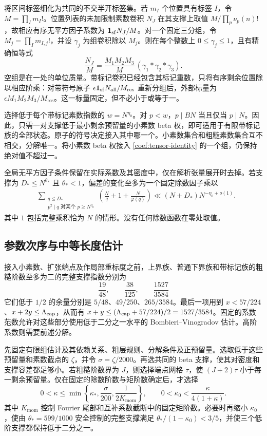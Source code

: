将区间标签细化为共同的不交半开标签集。若 $m_I$ 个位置具有标签 $I$，令 $M=\prod_I m_I!$。位置列表的未加限制素数卷积 $N_J$ 在其支撑上取值 $M/\prod_p\nu_p(n)!$，故相应有序无平方因子系数为 $\mathbf 1_{\mathrm{sf}}N_J/M$。对一个固定三分组，令 $M_j=\prod_I m_{I,j}!$，并设 $\gamma_j$ 为组卷积除以 $M_j$。则在每个整数上 $0\le\gamma_j\le1$，且有精确恒等式
\begin{equation}
 \frac{N_J}{M}
 =\frac{M_1M_2M_3}{M}\,
       (\gamma_1*\gamma_2*\gamma_3).
 \label{coef:tensor-identity}
\end{equation}
空组是在一处的单位质量。带标记卷积已经包含其标记重数，只将有序剩余位置除以相应阶乘：对带符号原子
$\epsilon\mathbf 1_{\mathrm{sf}}N_{\mathrm{all}}/M_{\mathrm{res}}$
重新分组后，外部标量为 $\epsilon M_1M_2M_3/M_{\mathrm{res}}$。这一标量固定，但不必小于或等于一。

选择低于每个带标记素数指数的 $w=N^{\eta_0}$。对 $p<w$，$p\mid BN$ 当且仅当 $p\mid N$。因此，只需一对支撑低于最小剩余预留量的小素数 beta 权，即可适用于有限带标记族的全部状态。原子的符号决定接入其中哪一个。小素数集合和粗糙素数集合互不相交，分解唯一。将小素数 beta 权接入 \eqref{coef:tensor-identity} 的一个组，仍保持绝对值不超过一。

全局无平方因子条件保留在实际系数及其密度中，仅在解析张量展开时去掉。若支撑为 $D_*\le N^{\theta_*}$ 且 $\theta_*<1$，偏差的变化至多为一个固定除数因子乘以
\begin{align}
 &\sum_{\substack{q\le D_*\\p^2\mid q\text{ 对某个 }p\ge N^{\eta_0}}}
 \left(\frac{N}{q}+1+\frac{N}{\varphi(q)}\right)
 \ll (N+D_*)N^{-\eta_0+o(1)}.
 \label{coef:collision}
\end{align}
其中 $1$ 包括完整乘积恰为 $N$ 的情形。没有任何除数函数在零处取值。

\subsection{参数次序与中等长度估计}

接入小素数、扩张端点及作局部重标度之前，上界族、普通下界族和带标记族的粗糙阶数至多为二的完整支撑指数分别为
\[
 \frac{19}{48},\qquad \frac{38}{125},\qquad
 \frac{1527}{3584}
\]
它们低于 $1/2$ 的余量分别是 $5/48$、$49/250$、$265/3584$。最后一项用到 $x<57/224$、$x+2y\le\Lambda_{\rm cap}$，从而有 $x+y\le(\Lambda_{\rm cap}+57/224)/2=1527/3584$。固定的系数范数允许对这些部分使用低于二分之一水平的 Bombieri--Vinogradov 估计。高阶系数则需要前述分解。

先固定有限组估计及其依赖关系、粗层规则、分解条件及正预留量。选取低于这些预留量和素数截点的 $\zeta$，并令 $\sigma=\zeta/2000$。再选共同的 beta 支撑，使其对密度和支撑容差都足够小。若粗糙阶数界为 $J$，则选择端点网格 $\tau$，使 $(J+2)\tau$ 小于每一剩余预留量。仅在固定的除数阶数与矩阶数确定后，才选择
\begin{equation}
 0<\kappa\le\min\left\{\kappa_*,\frac{\sigma}{200},
                         \frac1{2K_{\mathrm{mom}}}\right\},
 \qquad
 0<\kappa_0<\frac{\kappa}{4(1+\kappa)}.
 \label{coef:parameter-order}
\end{equation}
其中 $K_{\mathrm{mom}}$ 控制 Fourier 尾部和互补系数截断中的固定矩阶数。必要时再缩小 $\kappa_0$，使由 $\theta_*=599/1000$ 安全控制的完整支撑满足 $\theta_* /(1-\kappa_0)<3/5$，并使三个低阶支撑都保持低于二分之一。

